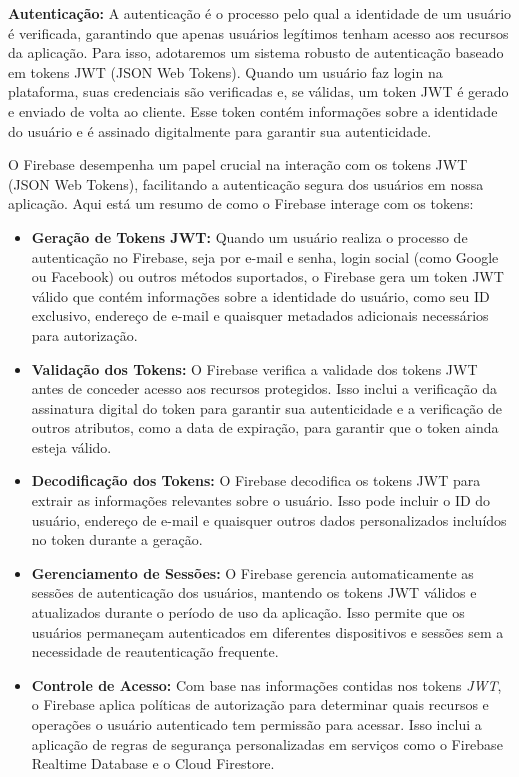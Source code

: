 \textbf{Autenticação:}
A autenticação é o processo pelo qual a identidade de um usuário é verificada, garantindo que apenas usuários legítimos tenham acesso aos recursos da aplicação. Para isso, adotaremos um sistema robusto de autenticação baseado em tokens JWT (JSON Web Tokens). Quando um usuário faz login na plataforma, suas credenciais são verificadas e, se válidas, um token JWT é gerado e enviado de volta ao cliente. Esse token contém informações sobre a identidade do usuário e é assinado digitalmente para garantir sua autenticidade.

O Firebase desempenha um papel crucial na interação com os tokens JWT (JSON Web Tokens), facilitando a autenticação segura dos usuários em nossa aplicação. Aqui está um resumo de como o Firebase interage com os tokens:

\begin{itemize}
\item \textbf{Geração de Tokens JWT:}
Quando um usuário realiza o processo de autenticação no Firebase, seja por e-mail e senha, login social (como Google ou Facebook) ou outros métodos suportados, o Firebase gera um token JWT válido que contém informações sobre a identidade do usuário, como seu ID exclusivo, endereço de e-mail e quaisquer metadados adicionais necessários para autorização.

\item \textbf{Validação dos Tokens:}
O Firebase verifica a validade dos tokens JWT antes de conceder acesso aos recursos protegidos. Isso inclui a verificação da assinatura digital do token para garantir sua autenticidade e a verificação de outros atributos, como a data de expiração, para garantir que o token ainda esteja válido.

\item \textbf{Decodificação dos Tokens:}
O Firebase decodifica os tokens JWT para extrair as informações relevantes sobre o usuário. Isso pode incluir o ID do usuário, endereço de e-mail e quaisquer outros dados personalizados incluídos no token durante a geração.

\item \textbf{Gerenciamento de Sessões:}
O Firebase gerencia automaticamente as sessões de autenticação dos usuários, mantendo os tokens JWT válidos e atualizados durante o período de uso da aplicação. Isso permite que os usuários permaneçam autenticados em diferentes dispositivos e sessões sem a necessidade de reautenticação frequente.

\item \textbf{Controle de Acesso:}
Com base nas informações contidas nos tokens \textit{\gls{JWT}}, o Firebase aplica políticas de autorização para determinar quais recursos e operações o usuário autenticado tem permissão para acessar. Isso inclui a aplicação de regras de segurança personalizadas em serviços como o Firebase Realtime Database e o Cloud Firestore.

\end{itemize}

